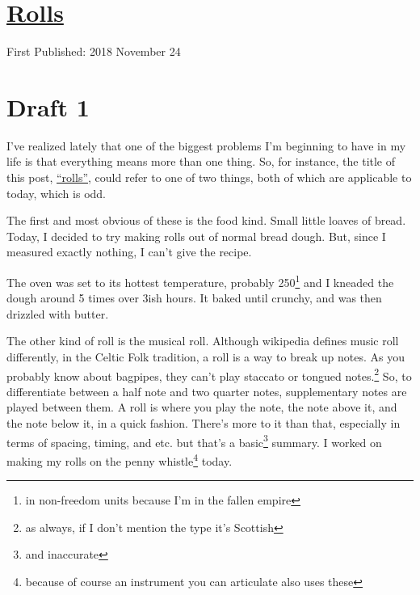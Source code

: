 \documentclass[12pt]{article}[titlepage]
\newcommand{\say}[1]{``#1''}
\newcommand{\1}{\={a}}
\newcommand{\2}{\={e}}
\newcommand{\3}{\={\i}}
\newcommand{\4}{\=o}
\newcommand{\5}{\=u}
\newcommand{\6}{\={A}}
\renewcommand{\,}{\textsuperscript{,}}
\begin{document}
\doublespacing
\section{\href{rolls.html}{Rolls}}
First Published: 2018 November 24
\section{Draft 1}
I've realized lately that one of the biggest problems I'm beginning to have in my life is that everything means more than one thing.
So, for instance, the title of this post, \href{rolls.html}{\say{rolls}}, could refer to one of two things, both of which are applicable to today, which is odd.

The first and most obvious of these is the food kind.
Small little loaves of bread.
Today, I decided to try making rolls out of normal bread dough.
But, since I measured exactly nothing, I can't give the recipe.

The oven was set to its hottest temperature, probably 250\footnote{in non-freedom units because I'm in the fallen empire} and I kneaded the dough around 5 times over 3ish hours.
It baked until crunchy, and was then drizzled with butter.

The other kind of roll is the musical roll.
Although wikipedia defines music roll differently, in the Celtic Folk tradition, a roll is a way to break up notes.
As you probably know about bagpipes, they can't play staccato or tongued notes.\footnote{as always, if I don't mention the type it's Scottish}
So, to differentiate between a half note and two quarter notes, supplementary notes are played between them.
A roll is where you play the note, the note above it, and the note below it, in a quick fashion.
There's more to it than that, especially in terms of spacing, timing, and etc. but that's a basic\footnote{and inaccurate} summary.
I worked on making my rolls on the penny whistle\footnote{because of course an instrument you can articulate also uses these} today.
\end{document}
